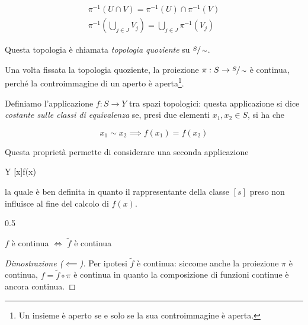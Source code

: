\begin{gather}
	\pi^{-1}(U \cap V) = \pi^{-1}(U) \cap \pi^{-1}(V) \\
	\pi^{-1}\left( \bigcup_{j \in J} V_{j} \right) = \bigcup_{j \in J} \pi^{-1}(V_{j})
\end{gather}

Questa topologia è chiamata \textit{topologia quoziente} su $ \sfrac{S}{\sim} $.

\begin{remark}
	Una volta fissata la topologia quoziente, la proiezione $ \pi : S \to \sfrac{S}{\sim} $ è continua, perché la controimmagine di un aperto è aperta\footnote{%
		Un insieme è aperto se e solo se la sua controimmagine è aperta.%
	}.
\end{remark}

Definiamo l'applicazione $ f : S \to Y $ tra spazi topologici: questa applicazione si dice \textit{costante sulle classi di equivalenza} se, presi due elementi $ x_{1}, x_{2} \in S $, si ha che

\begin{equation}
	x_{1} \sim x_{2} \implies f(x_{1}) = f(x_{2})
\end{equation}

Questa proprietà permette di considerare una seconda applicazione

	{}{Y}
	{[x]}{f(x)}

la quale è ben definita in quanto il rappresentante della classe $ [s] $ preso non influisce al fine del calcolo di $ f(x) $.

	{0.5}{%
			}

\begin{definition}
	$ f $ è continua $ \iff $ $ \tilde{f} $ è continua
\end{definition}

\begin{proof}[Dimostrazione ($ \impliedby $)]
	Per ipotesi  $ \tilde{f} $ è continua: siccome anche la proiezione $ \pi $ è continua, $ f = \tilde{f} \circ \pi $ è continua in quanto la composizione di funzioni continue è ancora continua.
\end{proof}

